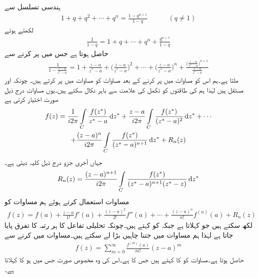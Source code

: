 ہندسی تسلسل سے
\begin{align*}
1+q+q^2+\cdots+q^n=\frac{1-q^{n+1}}{1-q}\quad \quad \quad (q\ne 1)
\end{align*}
لکھتے ہوئے 
\begin{align*}
\frac{1}{1-q}=1+q+\cdots+q^n+\frac{q^{n+1}}{1-q}
\end{align*}
حاصل ہوتا ہے جس میں  پر کرنے سے
\begin{align*}
\frac{1}{1-\frac{z-a}{z^*-a}}=1+\frac{z-a}{z^*-a}+\big(\frac{z-a}{z^*-a}\big)^2+\cdots+\big(\frac{z-a}{z^*-a}\big)^n+\frac{\big(\frac{z-a}{z^*-a}\big)^{n+1}}{\frac{z-a}{z^*-a}}
\end{align*}
ملتا ہے۔ہم اس کو مساوات  میں پر کرنے کے بعد مساوات  کو مساوات  میں پر کرتے ہیں۔ چونکہ  اور  مستقل ہیں لہٰذا ہم  کی طاقتوں کو تکمل کی علامت سے باہر نکال سکتے ہیں۔یوں مساوات  درج ذیل صورت اختیار کرتی ہے
\begin{multline}\label{مساوات_ٹیلر_کوشی_کلیہ_تکمل_ٹیلر_ت}
f(z)=\frac{1}{i2\pi}\int\limits_C \frac{f(z^*)}{z^*-a}\dif z^*+\frac{z-a}{i2\pi}\int\limits_C \frac{f(z^*)}{(z^*-a)^2}\dif z^*+\cdots\\
+\frac{(z-a)^n}{i2\pi}\int\limits_C \frac{f(z^*)}{(z^*-a)^{n+1}}\dif z^*+R_n(z)
\end{multline}
جہاں آخری جزو درج ذیل کلیہ دیتی ہے۔
\begin{align}\label{مساوات_ٹیلر_کوشی_کلیہ_تکمل_ٹیلر_ٹ}
R_n(z)=\frac{(z-a)^{n+1}}{i2\pi}\int\limits_C \frac{f(z^*)}{(z^*-a)^{n+1}(z^*-z)}\dif z^*
\end{align}
مساوات  استعمال کرتے ہوئے ہم مساوات  کو
\begin{align}\label{مساوات_ٹیلر_کوشی_کلیہ_تکمل_ٹیلر_ث}
f(z)=f(a)+\frac{z-a}{1!}f'(a)+\frac{(z-a)^2}{2!}f''(a)+\cdots+\frac{(z-a)^n}{n!}f^{(n)}(a)+R_n(z)
\end{align}
لکھ سکتے ہیں جو  کہلاتا ہے جبکہ  کو  کہتے ہیں۔چونکہ تحلیلی تفاعل  کا ہر رتبہ کا تفرق پایا جاتا ہے لہٰذا ہم مساوات  میں  جتنا چاہیں بڑا لے سکتے ہیں۔مساوات  میں  کرنے سے 
\begin{align}\label{مساوات_ٹیلر_کوشی_کلیہ_تکمل_ٹیلر_ج}
f(z)=\sum\limits_{m=0}^{\infty} \frac{f^{(m)}(a)}{m!}(z-a)^m
\end{align}
حاصل ہوتا ہے۔مساوات  کو  کا  کہتے ہیں جس کا   ہے۔اس کی وہ مخصوص صورت جس میں  ہو  کا   کہلاتا ہے۔ 

